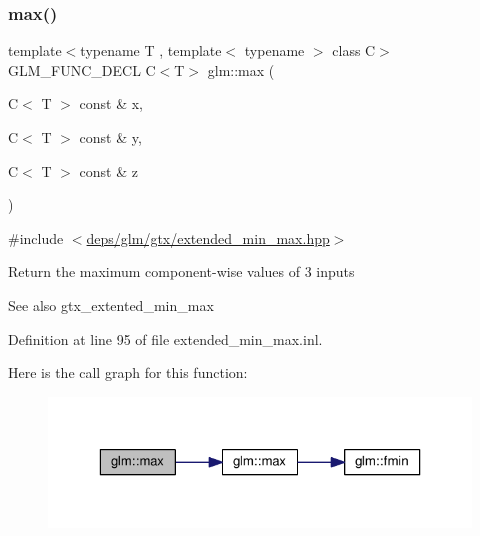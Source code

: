 \subsubsection{\texorpdfstring{max()}{max()}\hspace{0.1cm}{\footnotesize\ttfamily [3/6]}}
{\footnotesize\ttfamily template$<$typename T , template$<$ typename $>$ class C$>$ \\
G\+L\+M\+\_\+\+F\+U\+N\+C\+\_\+\+D\+E\+CL C$<$T$>$ glm\+::max (\begin{DoxyParamCaption}\item[{C$<$ T $>$ const \&}]{x,  }\item[{C$<$ T $>$ const \&}]{y,  }\item[{C$<$ T $>$ const \&}]{z }\end{DoxyParamCaption})}



{\ttfamily \#include $<$\hyperlink{extended__min__max_8hpp}{deps/glm/gtx/extended\+\_\+min\+\_\+max.\+hpp}$>$}

Return the maximum component-\/wise values of 3 inputs \begin{DoxySeeAlso}{See also}
gtx\+\_\+extented\+\_\+min\+\_\+max 
\end{DoxySeeAlso}


Definition at line 95 of file extended\+\_\+min\+\_\+max.\+inl.

Here is the call graph for this function\+:
\nopagebreak
\begin{figure}[H]
\begin{center}
\leavevmode
\includegraphics[width=323pt]{df/d72/group__gtx__extended__min__max_gaf832e9d4ab4826b2dda2fda25935a3a4_cgraph}
\end{center}
\end{figure}
\mbox{\label{group__gtx__extended__min__max_ga78e04a0cef1c4863fcae1a2130500d87}} 
